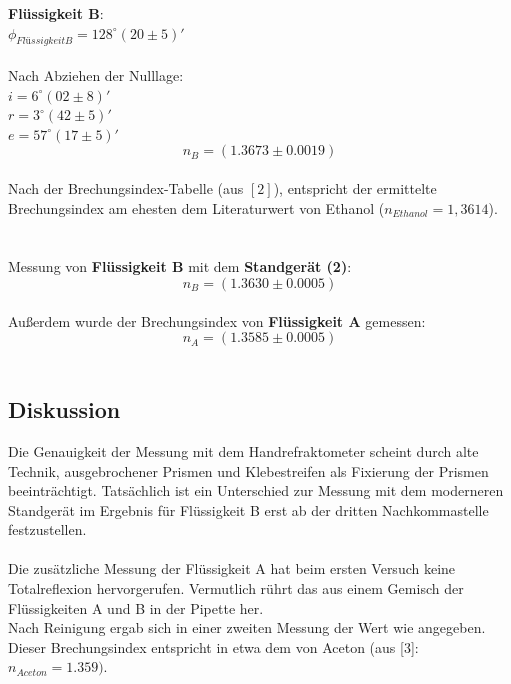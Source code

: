 \documentclass[12pt,a4paper]{article}
\begin{document}
\begin{multicols}{2}
\pagebreak

\noindent \textbf{Flüssigkeit B}:\\
$\phi_{FlüssigkeitB} = 128^\circ (20\pm 5)'$\\
\\
Nach Abziehen der Nulllage:\\
$i = 6^\circ (02 \pm 8)'$\\
$r = 3^\circ (42 \pm 5)'$\\
$e = 57^\circ (17\pm 5)'$
$$n_B = (1.3673 \pm  0.0019)$$
\\
Nach der Brechungsindex-Tabelle (aus $[2]$), entspricht der ermittelte Brechungsindex am ehesten dem Literaturwert von Ethanol ($n_{Ethanol} = 1,3614$).\\
\\
\\
Messung von \textbf{Flüssigkeit B} mit dem \textbf{Standgerät (2)}:\\
$$n_B = (1.3630 \pm 0.0005)$$
\\
Außerdem wurde der Brechungsindex von \textbf{Flüssigkeit A} gemessen:\\
$$n_A = (1.3585 \pm 0.0005)$$
\\

\subsection{Diskussion}
Die Genauigkeit der Messung mit dem Handrefraktometer scheint durch alte Technik, ausgebrochener Prismen und Klebestreifen als Fixierung der Prismen beeinträchtigt. Tatsächlich ist ein Unterschied zur Messung mit dem moderneren Standgerät im Ergebnis für Flüssigkeit B erst ab der dritten Nachkommastelle festzustellen.\\
\\
Die zusätzliche Messung der Flüssigkeit A hat beim ersten Versuch keine Totalreflexion hervorgerufen. Vermutlich rührt das aus einem Gemisch der Flüssigkeiten A und B in der Pipette her.\\
Nach Reinigung ergab sich in einer zweiten Messung der Wert wie angegeben. Dieser Brechungsindex entspricht in etwa dem von Aceton (aus [3]: $n_{Aceton}=1.359).$\\


\end{multicols}
\end{document}
